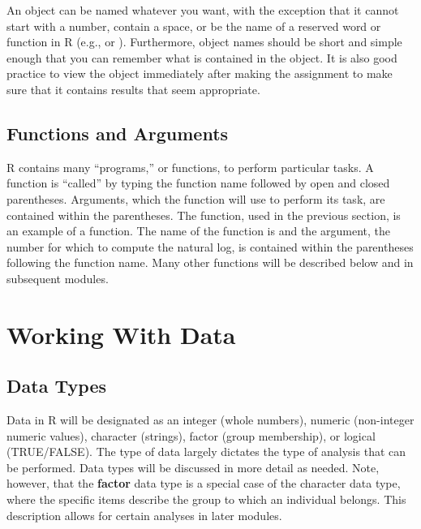 \documentclass[10pt,openany]{book}\usepackage[]{graphicx}\usepackage[]{color}
\begin{document}
An object can be named whatever you want, with the exception that it cannot start with a number, contain a space, or be the name of a reserved word or function in R (e.g.,  or ). Furthermore, object names should be short and simple enough that you can remember what is contained in the object. It is also good practice to view the object immediately after making the assignment to make sure that it contains results that seem appropriate.



\subsection{Functions and Arguments}  \label{sect:RFunctions}
R contains many ``programs,'' or functions, to perform particular tasks. A function is ``called'' by typing the function name followed by open and closed parentheses. Arguments, which the function will use to perform its task, are contained within the parentheses. The  function, used in the previous section, is an example of a function. The name of the function is  and the argument, the number for which to compute the natural log, is contained within the parentheses following the function name. Many other functions will be described below and in subsequent modules.




\section{Working With Data}
\subsection{Data Types}  \label{sect:RDataTypes}
Data in R will be designated as an integer (whole numbers), numeric (non-integer numeric values), character (strings), factor (group membership), or logical (TRUE/FALSE). The type of data largely dictates the type of analysis that can be performed. Data types will be discussed in more detail as needed. Note, however, that the \textbf{factor} data type is a special case of the character data type, where the specific items describe the group to which an individual belongs. This description allows for certain analyses in later modules.
\end{document}

